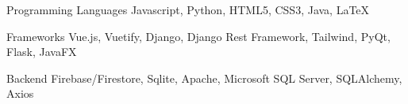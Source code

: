 


\begin{cvskills}


\cvskill
{Programming Languages} %
{Javascript, Python, HTML5, CSS3, Java, LaTeX} %


\cvskill
{Frameworks} %
{Vue.js, Vuetify, Django, Django Rest Framework, Tailwind, PyQt, Flask, JavaFX} %


\cvskill
{Backend} %
{ Firebase/Firestore, Sqlite, Apache, Microsoft SQL Server, SQLAlchemy, Axios} %


\end{cvskills}